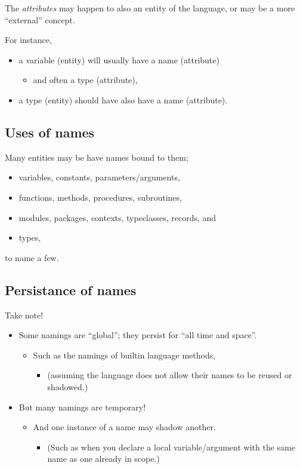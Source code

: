 \documentclass[11pt]{article}
\theoremstyle{definition}
\begin{document}
The \emph{attributes} may happen to also an entity of the language,
or may be a more “external” concept.

For instance,
\begin{itemize}
\item a variable (entity) will usually have a name (attribute)
\begin{itemize}
\item and often a type (attribute),
\end{itemize}
\item a type (entity) should have also have a name (attribute).
\end{itemize}

\subsection{Uses of names}
\label{sec:org5fb8c2b}

Many entities may be have names bound to them;
\begin{itemize}
\item variables, constants, parameters/arguments,
\item functions, methods, procedures, subroutines,
\item modules, packages, contexts, typeclasses, records, and
\item types,
\end{itemize}
to name a few.

\subsection{Persistance of names}
\label{sec:org7cf9a95}

Take note!
\begin{itemize}
\item Some namings are “global”; they persist for “all time and space”.
\begin{itemize}
\item Such as the namings of builtin language methods,
\begin{itemize}
\item (assuming the language does not allow their names to be reused
or shadowed.)
\end{itemize}
\end{itemize}
\item But many namings are temporary!
\begin{itemize}
\item And one instance of a name may shadow another.
\begin{itemize}
\item (Such as when you declare a local variable/argument
with the same name as one already in scope.)
\end{itemize}
\end{itemize}
\end{itemize}
\end{document}
